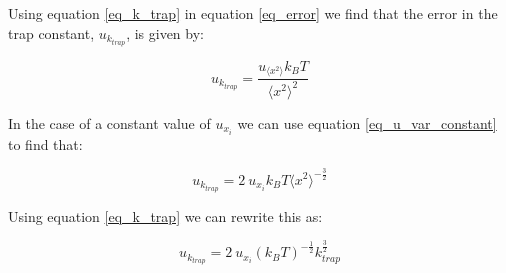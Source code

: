  

Using equation \ref{eq_k_trap} in equation \ref{eq_error} we find that the error in the trap constant, $u_{k_{trap}}$, is given by:

\begin{equation}
	\label{eq_u_k}
	u_{k_{trap}} = \frac{u_{ \langle x^2 \rangle}k_B T}{ \langle x^2 \rangle ^2}
\end{equation}

In the case of a constant value of $ u_{x_i}$ we can use equation \ref{eq_u_var_constant} to find that:

\begin{equation}
	\label{eq_u_k_constant}
	u_{k_{trap}} = 2 \: u_{x_i} k_B T  \langle x^2 \rangle ^{- \frac{3}{2}}
\end{equation}

Using equation \ref{eq_k_trap} we can rewrite this as:

\begin{equation}
	\label{eq_u_k_constant_}
	u_{k_{trap}} = 2 \: u_{x_i} (k_B T)^{-\frac{1}{2}}  k_{trap} ^{\frac{3}{2}}
\end{equation}





